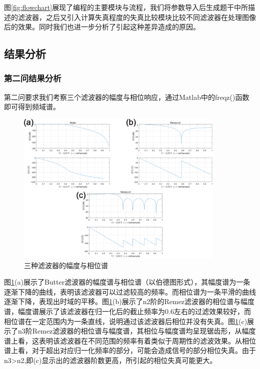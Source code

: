 \documentclass{article}
\begin{document}
图\ref{fig:flowchart}展现了编程的主要模块与流程，我们将参数导入后生成题干中所描述的滤波器，之后又引入计算失真程度的失真比较模块比较不同滤波器在处理图像后的效果。同时我们也进一步分析了引起这种差异造成的原因。
\subsection{结果分析}

\subsubsection{第二问结果分析}
第二问要求我们考察三个滤波器的幅度与相位响应，通过Matlab中的freqz()函数即可得到频域谱。
\begin{figure}[h]
    \centering
    \includegraphics[width=10cm]{lvboxiangwei.eps}
    \caption{三种滤波器的幅度与相位谱}
    \label{fig:xiangwei}
\end{figure}

图\ref{fig:xiangwei}(a)展示了Butter滤波器的幅度谱与相位谱（以伯德图形式），其幅度谱为一条逐渐下降的曲线，表明该滤波器可以过滤较高的频率。而相位谱为一条平滑的曲线逐渐下降，表现出时域的平移。图\ref{fig:xiangwei}(b)展示了n2阶的Remez滤波器的相位谱与幅度谱，幅度谱展示了该滤波器在归一化后的截止频率为0.6左右的过滤效果较好，而相位谱在一定范围内为一条直线，说明通过该滤波器后相位并没有失真。图\ref{fig:xiangwei}(c)展示了n3阶Remez滤波器的相位谱与幅度谱，其相位与幅度谱均呈现锯齿形，从幅度谱上看，这表明该滤波器在不同范围的频率有着类似于周期性的滤波效果。从相位谱上看，对于超出对应归一化频率的部分，可能会造成信号的部分相位失真。由于n3>n2,即(c)显示出的滤波器阶数更高，所引起的相位失真可能更大。
\end{document}

